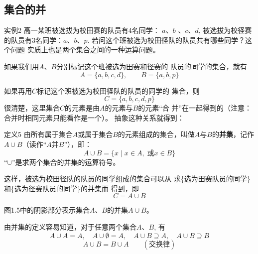 \subsection{集合的并}
\begin{thm}{实例2}
    高一某班被选拔为校田赛的队员有4名同学：
$a$、$b$
、$c$、$d$, 被选拔为校径赛的队员有3名同学：$a$、$b$、$p$. 
若问这个班被选为校田径队的队员共有哪些同学？这个问题
实质上也是两个集合之间的一种运算问题。
\end{thm}

如果我们用$A$、$B$分别标记这个班被选为田赛和径赛的
队员的同学的集合，就有
\[A=\{a,b,c,d\},\qquad 
B=\{a,b,p\}\]

如果再用$C$标记这个班被选为校田径队的队员的同学的
集合，则
\[C=\{a,b,c,d,p\}\]
很清楚，这里集合$C$的元素是由$A$的元素与$B$的元素“合
并”在一起得到的（注意：合并时相同元素只能看作是一个）。
抽象这种关系就得到：

\begin{thm}{定义5}
    由所有属于集合$A$或属于集合$B$的元素组成的集合，叫做$A$与$B$的\textbf{并集}，记作$A\cup B$（读作“$A$并$B$”），即：
    \[A\cup B=\{x\mid x\in A,\; \text{或}x\in B\}\]
“$\cup$”是求两个集合的并集的运算符号。
\end{thm}

这样，被选为校田径队的队员的同学组成的集合可以从
求\{选为田赛队员的同学\}和\{选为径赛队员的同学\}的并集而
得到，即
\[C=A\cup B\]

图1.5中的阴影部分表示集合$A$、$B$的并集$A\cup B$。

由并集的定义容易知道，对于任意两个集合$A$、$B$, 有
\[A\cup A=A,\quad A\cup\emptyset=A,\quad A\cup B\supseteq A, \quad A\cup B\supseteq B\]
\[A\cup B=B\cup A\qquad (\text{交换律})\]

\begin{figure}[htp]
\begin{minipage}{0.45\textwidth}
    \centering
{}
    \caption{}
  \end{minipage}
  \hfill 
  \begin{minipage}{0.45\textwidth}
    \centering
    \caption{}
  \end{minipage}
\end{figure}


